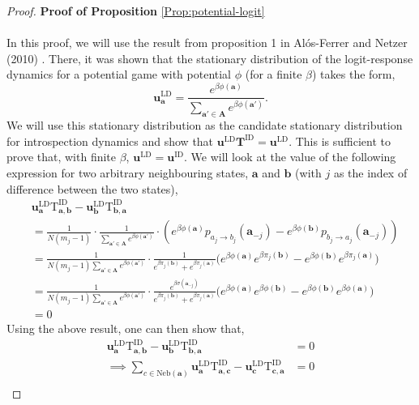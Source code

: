 \documentclass[11pt]{article}
\theoremstyle{plainCl1}
\theoremstyle{plainCl2}
\newcommand{\A}{\mathbf{A}}
\newcommand{\abf}{\mathbf{a}}
\newcommand{\bbf}{\mathbf{b}}
\newcommand{\cbf}{\mathbf{c}}
\newcommand{\T}{\mathbf{T}}
\newcommand{\ubf}{\mathbf{u}}
\newcommand{\LD}{\mathrm{LD}}
\newcommand{\ID}{\mathrm{ID}}
\begin{document}
\begin{proof}
\textbf{Proof of Proposition} \ref{Prop:potential-logit} \\ \\
In this proof, we will use the result from proposition 1 in Al\'{o}s-Ferrer and Netzer (2010) \cite{Alos-Ferrer:GEB:2010}. There, it was shown that the stationary distribution of the logit-response dynamics for a potential game with potential $\phi$ (for a finite $\beta$) takes the form,
\begin{equation}
\ubf^\LD_\abf = \frac{\displaystyle e^{\beta \phi(\abf)}}{\displaystyle \sum_{\abf' \in \A} e^{\beta \phi(\abf')}}.
\end{equation}
\noindent We will use this stationary distribution as the candidate stationary distribution for introspection dynamics and show that $\ubf^\LD \T^\ID = \ubf^\LD$. This is sufficient to prove that, with finite $\beta$, $\ubf^\LD = \ubf^\ID$. We will look at the value of the following expression for two arbitrary neighbouring states, $\abf$ and $\bbf$ (with $j$ as the index of difference between the two states), \\
\begin{align}
&\ubf^\LD_\abf \mathrm{T}^\ID_{\abf,\bbf} - \ubf^\LD_\bbf \mathrm{T}^\ID_{\bbf,\abf} \\[15pt]
&= \frac{1}{N(m_j - 1)} \cdot \frac{1}{\displaystyle \sum_{\abf' \in \A} e^{\beta \phi(\abf')}} \cdot (e^{\beta \phi(\abf)}p_{a_j \to b_j}(\abf_{-j}) - e^{\beta\phi(\bbf)} p_{b_j \to a_j}(\abf_{-j})) \\[10pt]
&= \frac{1}{N(m_j - 1)\displaystyle \sum_{\abf' \in \A} e^{\beta \phi(\abf')}} \cdot \frac{1}{\displaystyle e^{\beta \pi_j(\bbf)} + e^{\beta \pi_j(\abf)}} \bigg( e^{\beta \phi(\abf)} e^{\beta \pi_j(\bbf)} - e^{\beta \phi(\bbf)} e^{\beta \pi_j(\abf)} \bigg) \\[10pt]
&= \frac{1}{N(m_j - 1)\displaystyle \sum_{\abf' \in \A} e^{\beta \phi(\abf')}} \cdot \frac{e^{\beta\sigma(\abf_{-j})}}{\displaystyle e^{\beta \pi_j(\bbf)} + e^{\beta \pi_j(\abf)}} \bigg( e^{\beta \phi(\abf)} e^{\beta \phi(\bbf)} - e^{\beta \phi(\bbf)} e^{\beta \phi(\abf)} \bigg) \\[10pt]
&= 0
\end{align}
\noindent Using the above result, one can then show that, 
\begin{align}
\label{Eq:step-1-detailed-balance}
\ubf^\LD_\abf \mathrm{T}^\ID_{\abf,\bbf} - \ubf^\LD_\bbf \mathrm{T}^\ID_{\bbf,\abf} &= 0 \\[10pt]
\implies \sum_{c \in \mathrm{Neb}(\abf)} \ubf^\LD_\abf \mathrm{T}^\ID_{\abf,\cbf} - \ubf^\LD_\cbf \mathrm{T}^\ID_{\cbf,\abf} &= 0 \\[10pt]

\end{align}
\end{proof}
\end{document}

